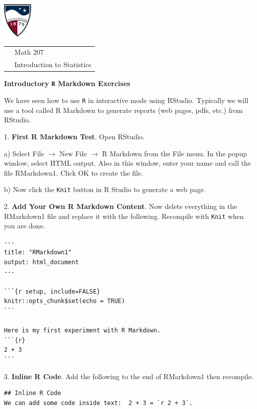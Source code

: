 \documentclass[10pt]{article}
\begin{document}
\pagestyle{empty}
\lstset{language=R, showspaces=false, showstringspaces=false}

\href{http://www.su.edu}{\includegraphics[height=1.75cm]{sulogo.eps}}
\vspace{-1.69cm}

{\small \hfill
\begin{tabular}{cl}
& Math 207\\& Introduction to Statistics\\
\end{tabular}
}
\setlength{\baselineskip}{1.05\baselineskip}
\medskip

\begin{center}
\textbf{\large  Introductory \texttt{R} Markdown Exercises}
\end{center}

We have seen how to use \texttt{R} in interactive mode using RStudio.  Typically
we will use a tool called R Markdown to generate reports (web pages, pdfs, etc.)
from RStudio.
\medskip

1. \textbf{First R Markdown Test}. Open  RStudio.

\hspace{10pt} a) Select File $\to$ New File $\to$ R Markdown from the File menu.
In the popup window, select HTML output.  Also in this window, enter your name and
call the file RMarkdown1.  Click OK to create the file.

\hspace{10pt} b) Now click the \texttt{Knit} button in R Studio to generate a web page.
\medskip

2. \textbf{Add Your Own R Markdown Content}.
Now delete everything in the RMarkdown1 file and replace it
with the following. Recompile with \texttt{Knit} when you are done. \vspace{-10pt}
\begin{verbatim}
---
title: "RMarkdown1"
output: html_document
---

```{r setup, include=FALSE}
knitr::opts_chunk$set(echo = TRUE)
```

Here is my first experiment with R Markdown.
```{r}
2 + 3
```
\end{verbatim}

3. \textbf{Inline R Code}.
Add the following to the end of RMarkdown1 then recompile.\vspace{-10pt}
\begin{verbatim}
## Inline R Code
We can add some code inside text:  2 + 3 = `r 2 + 3`.
\end{verbatim}
\end{document}

